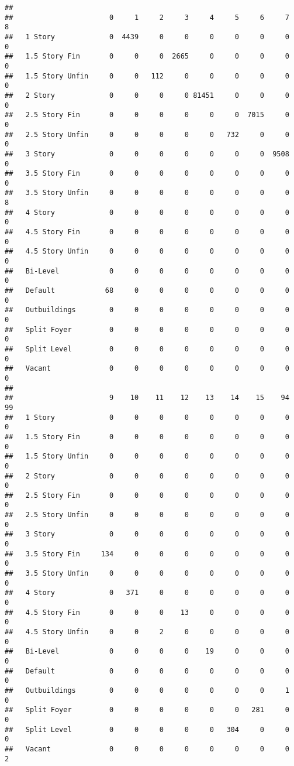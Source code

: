 \documentclass[]{article}
\begin{document}
\begin{verbatim}
##                  
##                       0     1     2     3     4     5     6     7     8
##   1 Story             0  4439     0     0     0     0     0     0     0
##   1.5 Story Fin       0     0     0  2665     0     0     0     0     0
##   1.5 Story Unfin     0     0   112     0     0     0     0     0     0
##   2 Story             0     0     0     0 81451     0     0     0     0
##   2.5 Story Fin       0     0     0     0     0     0  7015     0     0
##   2.5 Story Unfin     0     0     0     0     0   732     0     0     0
##   3 Story             0     0     0     0     0     0     0  9508     0
##   3.5 Story Fin       0     0     0     0     0     0     0     0     0
##   3.5 Story Unfin     0     0     0     0     0     0     0     0     8
##   4 Story             0     0     0     0     0     0     0     0     0
##   4.5 Story Fin       0     0     0     0     0     0     0     0     0
##   4.5 Story Unfin     0     0     0     0     0     0     0     0     0
##   Bi-Level            0     0     0     0     0     0     0     0     0
##   Default            68     0     0     0     0     0     0     0     0
##   Outbuildings        0     0     0     0     0     0     0     0     0
##   Split Foyer         0     0     0     0     0     0     0     0     0
##   Split Level         0     0     0     0     0     0     0     0     0
##   Vacant              0     0     0     0     0     0     0     0     0
##                  
##                       9    10    11    12    13    14    15    94    99
##   1 Story             0     0     0     0     0     0     0     0     0
##   1.5 Story Fin       0     0     0     0     0     0     0     0     0
##   1.5 Story Unfin     0     0     0     0     0     0     0     0     0
##   2 Story             0     0     0     0     0     0     0     0     0
##   2.5 Story Fin       0     0     0     0     0     0     0     0     0
##   2.5 Story Unfin     0     0     0     0     0     0     0     0     0
##   3 Story             0     0     0     0     0     0     0     0     0
##   3.5 Story Fin     134     0     0     0     0     0     0     0     0
##   3.5 Story Unfin     0     0     0     0     0     0     0     0     0
##   4 Story             0   371     0     0     0     0     0     0     0
##   4.5 Story Fin       0     0     0    13     0     0     0     0     0
##   4.5 Story Unfin     0     0     2     0     0     0     0     0     0
##   Bi-Level            0     0     0     0    19     0     0     0     0
##   Default             0     0     0     0     0     0     0     0     0
##   Outbuildings        0     0     0     0     0     0     0     1     0
##   Split Foyer         0     0     0     0     0     0   281     0     0
##   Split Level         0     0     0     0     0   304     0     0     0
##   Vacant              0     0     0     0     0     0     0     0     2
\end{verbatim}
\end{document}
